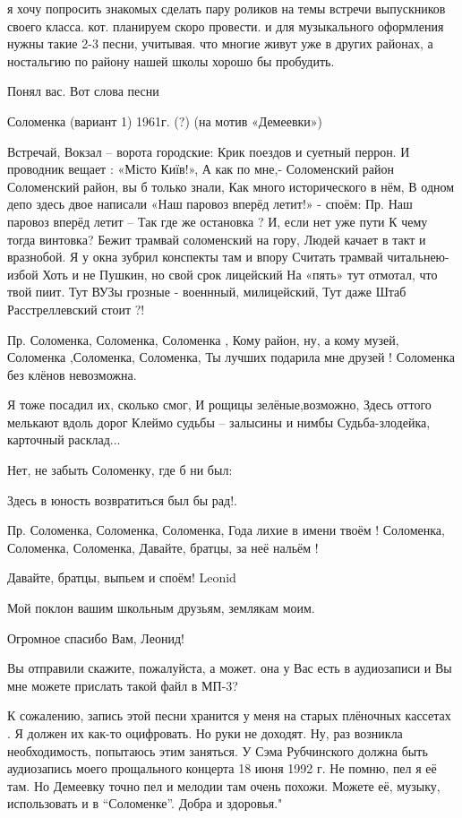 я хочу попросить знакомых сделать пару роликов на темы встречи выпускников
своего класса. кот. планируем скоро провести. и для музыкального оформления
нужны такие 2-3 песни, учитывая. что многие живут уже в других районах, а
ностальгию по району нашей школы хорошо бы пробудить.

Понял вас. Вот слова песни

Соломенка  (вариант 1)          1961г. (?)
(на мотив «Демеевки»)

\obeycr
Встречай, Вокзал – ворота городские:
Крик поездов и суетный перрон.
И проводник  вещает : «Місто Київ!»,
А как по мне,- Соломенский район   
Соломенский район, вы б только знали,
Как много исторического в нём,
В одном депо здесь двое написали
«Наш паровоз вперёд летит!» - споём:
Пр.  Наш паровоз вперёд летит –
Так где же остановка ?
И, если нет уже пути
К чему тогда винтовка?
Бежит трамвай соломенский на гору,
Людей качает в такт и вразнобой.
Я у окна зубрил конспекты там и впору
Считать трамвай читальнею-избой
Хоть и не Пушкин, но свой срок лицейский
На «пять» тут отмотал, что твой пиит.
Тут ВУЗы грозные -  военнный, милицейский,
Тут даже Штаб Расстреллевский стоит ?!
\restorecr

\obeycr
Пр.   Соломенка, Соломенка, Соломенка ,
Кому район, ну, а кому музей,
Соломенка ,Соломенка, Соломенка,
Ты лучших подарила мне друзей !
Соломенка без клёнов невозможна.
\restorecr

\obeycr
Я тоже посадил их, сколько смог,
И рощицы зелёные,возможно,
Здесь оттого мелькают вдоль дорог
Клеймо судьбы – залысины и нимбы
Судьба-злодейка, карточный расклад...
\restorecr

Нет, не забыть Соломенку, где б ни был:

Здесь в юность возвратиться был бы рад!.

\obeycr
Пр.  Соломенка, Соломенка, Соломенка,
Года лихие в имени твоём !
Соломенка, Соломенка, Соломенка,
Давайте, братцы, за неё нальём !
\restorecr

Давайте, братцы,  выпьем и споём! Leonid

Мой поклон вашим школьным друзьям, землякам моим.

Огромное спасибо Вам, Леонид!

Вы отправили скажите, пожалуйста, а может. она у Вас есть в аудиозаписи и Вы
мне можете прислать такой файл в МП-3?

К сожалению, запись этой песни хранится у меня на старых плёночных кассетах . Я
должен их как-то оцифровать. Но руки не доходят. Ну, раз возникла
необходимость, попытаюсь этим заняться. У Сэма Рубчинского должна быть
аудиозапись моего прощального концерта 18 июня 1992 г. Не помню, пел я её там.
Но Демеевку точно пел и мелодии там очень похожи. Можете её, музыку,
использовать и в \enquote{Соломенке}.  Добра и здоровья."

